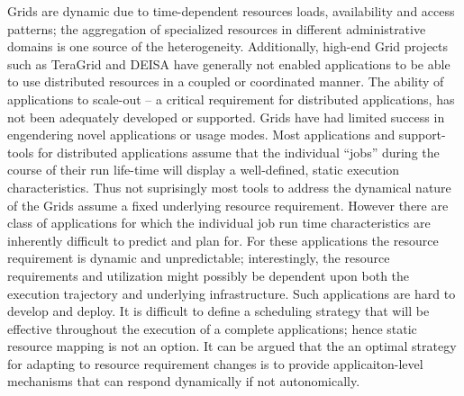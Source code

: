 \documentclass[conference,final]{IEEEtran}
\begin{document}


Grids are dynamic due to time-dependent resources loads, availability
and access patterns; the aggregation of specialized resources in
different administrative domains is one source of the heterogeneity.
Additionally, high-end Grid projects such as TeraGrid and DEISA have
generally not enabled applications to be able to use distributed
resources in a coupled or coordinated manner. The ability of
applications to scale-out -- a critical requirement for distributed
applications, has not been adequately developed or supported. Grids
have had limited success in engendering novel applications or usage
modes.  Most applications and support-tools for distributed
applications assume that the individual ``jobs'' during the course of
their run life-time will display a well-defined, static execution
characteristics.  Thus not suprisingly most tools to address the
dynamical nature of the Grids assume a fixed underlying resource
requirement.  However there are class of applications for which the
individual job run time characteristics are inherently difficult to
predict and plan for. For these applications the resource requirement
is dynamic and unpredictable; interestingly, the resource requirements
and utilization might possibly be dependent upon both the execution
trajectory and underlying infrastructure. Such applications are hard
to develop and deploy. It is difficult to define a scheduling strategy
that will be effective throughout the execution of a complete
applications; hence static resource mapping is not an option.  It can
be argued that the an optimal strategy for adapting to resource
requirement changes is to provide applicaiton-level mechanisms that
can respond dynamically if not autonomically.
\end{document}
